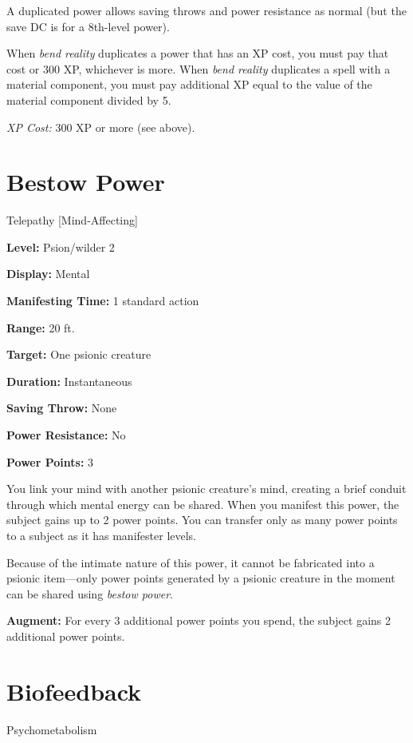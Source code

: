 \documentclass{article}
\begin{document}
A duplicated power allows saving throws and power resistance as normal (but the 
save DC is for a 8th-level power).

When \textit{bend reality }duplicates a power that has an XP cost, you must pay 
that cost or 300 XP, whichever is more. When \textit{bend reality }duplicates a 
spell with a material component, you must pay additional XP equal to the value 
of the material component divided by 5.

\parindent=0pt
\textit{XP Cost: }300 XP or more (see above).

\vspace{12pt}
\section*{Bestow Power}

Telepathy [Mind-Affecting]

\textbf{Level:} Psion/wilder 2

\textbf{Display:} Mental

\textbf{Manifesting Time:} 1 standard action

\textbf{Range:} 20 ft.

\textbf{Target:} One psionic creature

\textbf{Duration:} Instantaneous

\textbf{Saving Throw:} None

\textbf{Power Resistance:} No

\textbf{Power Points:} 3

You link your mind with another psionic creature's mind, creating a brief conduit 
through which mental energy can be shared. When you manifest this power, the subject 
gains up to 2 power points. You can transfer only as many power points to a subject 
as it has manifester levels.

Because of the intimate nature of this power, it cannot be fabricated into a psionic 
item---only power points generated by a psionic creature in the moment can be shared 
using \textit{bestow power}.

\textbf{Augment:} For every 3 additional power points you spend, the subject gains 
2 additional power points.

\vspace{12pt}
\section*{Biofeedback}

Psychometabolism
\end{document}
